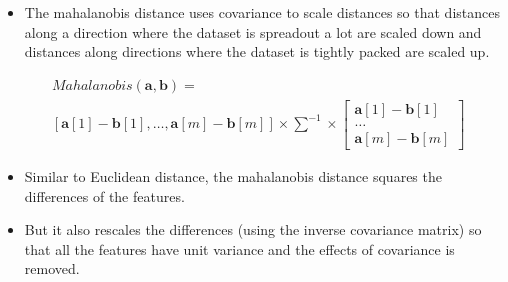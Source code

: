 \documentclass[xcolor={table}]{beamer}
\begin{document}
\begin{frame}
	\begin{itemize}
		\item The mahalanobis distance uses covariance to scale distances so that distances along a direction where the dataset is spreadout a lot are scaled down and distances along directions where the dataset is tightly packed are scaled up. 
	\end{itemize}
\begin{equation}
	\begin{alignedat}{2}
&Mahalanobis(\mathbf{a},\mathbf{b}) =\\
&\left[\mathbf{a}[1] - \mathbf{b}[1], \ldots, \mathbf{a}[m] - \mathbf{b}[m] \right] \times \sum^{-1} \times    \left[   \begin{matrix} \mathbf{a}[1] - \mathbf{b}[1]\\ \ldots \\ \mathbf{a}[m] - \mathbf{b}[m] \end{matrix} \right]
	\end{alignedat}
\label{eq:mahalanobis}
\end{equation}
\end{frame} 


\begin{frame}
	\begin{itemize}
		\item Similar to Euclidean distance, the mahalanobis distance squares the differences of the features. 
		\item But it also rescales the differences (using the inverse covariance matrix) so that all the features have unit variance and the effects of covariance is removed. 
	\end{itemize}
\end{frame} 
\end{document}
